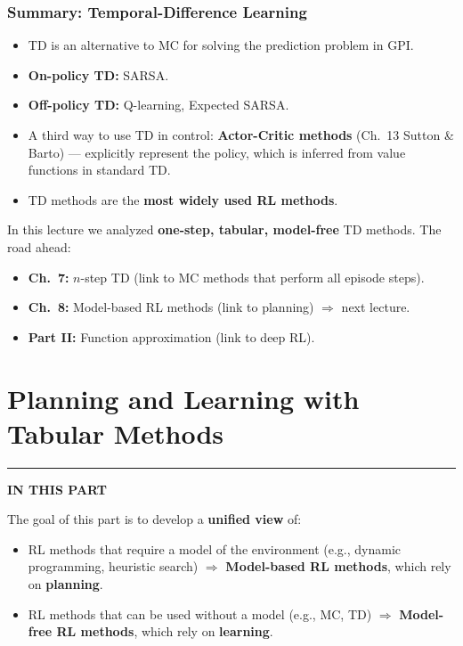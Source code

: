 \documentclass[11pt,a4paper]{article}
\theoremstyle{definition}
\theoremstyle{plain}
\theoremstyle{remark}
\newcommand{\partmtoc}{%
  \vspace{2pt}%
  {\color{rlrule}\rule{\linewidth}{0.5pt}}\par\vspace{3pt}%
  {\footnotesize\bfseries\color{rlaccent}IN THIS PART}\par\vspace{2pt}%
  \begingroup
  \etocsetnexttocdepth{subsection}%
  \localtableofcontents
  \endgroup
  \vspace{2pt}{\color{rlrule}\rule{\linewidth}{0.5pt}}\par\vspace{10pt}}
\begin{document}
\section{Summary: Temporal-Difference Learning}

\begin{itemize}
    \item TD is an alternative to MC for solving the prediction problem in GPI.
    \item \textbf{On-policy TD:} SARSA.
    \item \textbf{Off-policy TD:} Q-learning, Expected SARSA.
    \item A third way to use TD in control: \textbf{Actor-Critic methods} (Ch.\ 13 Sutton \& Barto) — explicitly represent the policy, which is inferred from value functions in standard TD.
    \item TD methods are the \textbf{most widely used RL methods}.
\end{itemize}

In this lecture we analyzed \textbf{one-step, tabular, model-free} TD methods. The road ahead:
\begin{itemize}
    \item \textbf{Ch.\ 7:} $n$-step TD (link to MC methods that perform all episode steps).
    \item \textbf{Ch.\ 8:} Model-based RL methods (link to planning) $\Rightarrow$ next lecture.
    \item \textbf{Part II:} Function approximation (link to deep RL).
\end{itemize}


\part{Planning and Learning with Tabular Methods}
\partmtoc

The goal of this part is to develop a \textbf{unified view} of:
\begin{itemize}
    \item RL methods that require a model of the environment (e.g., dynamic programming, heuristic search) $\Rightarrow$ \textbf{Model-based RL methods}, which rely on \textbf{planning}.
    \item RL methods that can be used without a model (e.g., MC, TD) $\Rightarrow$ \textbf{Model-free RL methods}, which rely on \textbf{learning}.
\end{itemize}
\end{document}
